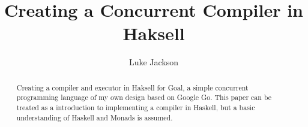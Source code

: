 \documentclass{report}
\author{Luke Jackson}
\title{Creating a Concurrent Compiler in Haksell}
\begin{document}
\maketitle

\begin{abstract}
Creating a compiler and executor in Haksell for Goal, a simple concurrent programming language of my own design based on Google Go. This paper can be treated as a introduction to implementing a compiler in Haskell, but a basic understanding of Haskell and Monads is assumed.
\end{abstract}

\tableofcontents









\end{document}
